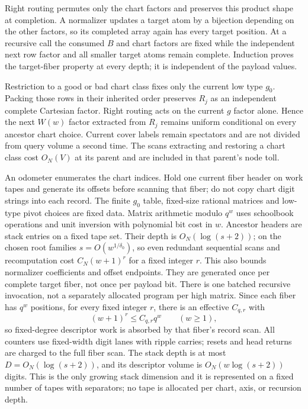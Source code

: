 Right routing permutes only the chart factors and preserves this product
shape at completion. A normalizer updates a target atom by a bijection
depending on the other factors, so its completed array again has every
target position. At a recursive call the consumed $B$ and chart factors
are fixed while the independent next row factor and all smaller target
atoms remain complete. Induction proves the target-fiber property at
every depth; it is independent of the payload values.

Restriction to a good or bad chart class fixes only the current low type
$g_0$. Packing those rows in their inherited order preserves $R_j$ as an
independent complete Cartesian factor. Right routing acts on the current
$g$ factor alone. Hence the next $W(w)$ factor extracted from $R_j$ remains
uniform conditional on every ancestor chart choice. Current cover labels
remain spectators and are not divided from query volume a second time.
The scans extracting and restoring a chart class cost $O_N(V)$ at its
parent and are included in that parent's node toll.

An odometer enumerates the chart indices. Hold one current fiber header
on work tapes and generate its offsets before scanning that fiber; do
not copy chart digit strings into each record. The finite $g_0$ table,
fixed-size rational matrices and low-type pivot choices are fixed data.
Matrix arithmetic modulo $q^w$ uses schoolbook operations and unit
inversion with polynomial bit cost in $w$. Ancestor headers are stack
entries on a fixed tape set. Their depth is $O_N(\log(s+2))$; on the
chosen root families $s=O(w^{1/\delta_0})$, so even redundant sequential
scans and recomputation cost $C_N(w+1)^r$ for a fixed integer $r$.
This also bounds normalizer coefficients and offset endpoints. They
are generated once per complete target fiber, not once per payload bit.
There is one batched recursive invocation, not a separately allocated
program per high matrix. Since each fiber has $q^w$ positions, for every
fixed integer $r$, there is an effective $C_{q,r}$ with
\begin{equation}
 (w+1)^r\le C_{q,r}q^w\qquad(w\ge1),                \label{eq:movement-7}
\end{equation}
so fixed-degree descriptor work is absorbed by that fiber's record scan.
All counters use fixed-width digit lanes with ripple carries; resets and
head returns are charged to the full fiber scan. The stack depth is at
most $D=O_N(\log(s+2))$, and its descriptor volume is
$O_N(w\log(s+2))$ digits. This is the only growing stack dimension and
it is represented on a fixed number of tapes with separators; no tape is
allocated per chart, axis, or recursion depth.

